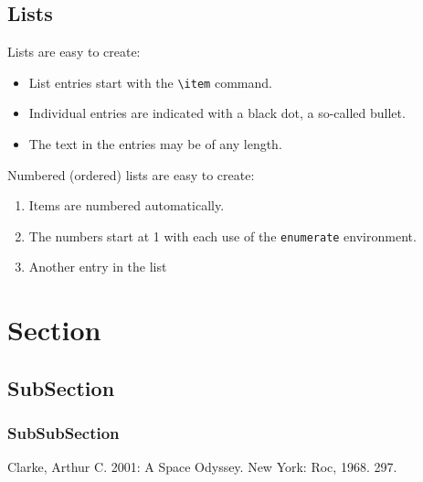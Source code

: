 \documentclass[12pt, dvipsnames, a4paper]{article}
\begin{document}
\subsection{Lists}
Lists are easy to create:
\begin{itemize}
	\item List entries start with the \verb|\item| command.
	\item Individual entries are indicated with a black dot, a so-called bullet.
	\item The text in the entries may be of any length.
\end{itemize}
Numbered (ordered) lists are easy to create:
\begin{enumerate}
	\item Items are numbered automatically.
	\item The numbers start at 1 with each use of the \texttt{enumerate} environment.
	\item Another entry in the list
\end{enumerate}

\section{Section}
\lipsum[1]
\subsection{SubSection}
\lipsum[1]
\subsubsection{SubSubSection}
\lipsum[1]

\begin{thebibliography}{00}
	 Clarke, Arthur C. 2001: A Space Odyssey. New York: Roc, 1968. 297.
\end{thebibliography}
\end{document}
